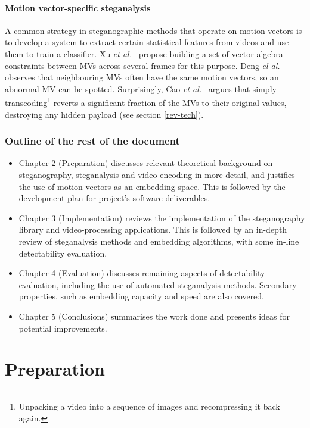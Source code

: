 \documentclass[12pt,british,twoside,notitlepage,usenames,dvipsnames,hypens,final]{report}
\numberwithin{equation}{section}
\numberwithin{figure}{section}
\begin{document}
\subsubsection*{Motion vector-specific steganalysis}

A common strategy in steganographic methods that operate on motion vectors is to develop a system to extract certain statistical features from videos and use them to train a classifier. Xu \emph{et al.}~\cite{xu2013video} propose building a set of vector algebra constraints between MVs across several frames for this purpose. Deng \emph{el al.}~\cite{deng2012digital} observes that neighbouring MVs often have the same motion vectors, so an abnormal MV can be spotted. Surprisingly, Cao \emph{et al.}~\cite{cao2012video} argues that simply transcoding\footnote{Unpacking a video into a sequence of images and recompressing it back again.} reverts a significant fraction of the MVs to their original values, destroying any hidden payload (see section \ref{rev-tech}).

\subsection*{Outline of the rest of the document}
\begin{itemize}
\item Chapter 2 (Preparation) discusses relevant theoretical background on steganography, steganalysis and video encoding in more detail, and justifies the use of motion vectors as an embedding space. This is followed by the development plan for project's software deliverables. 
\item Chapter 3 (Implementation) reviews the implementation of the steganography library and video-processing applications. This is followed by an in-depth review of steganalysis methods and embedding algorithms, with some in-line detectability evaluation.
\item Chapter 4 (Evaluation) discusses remaining aspects of detectability evaluation, including the use of automated steganalysis methods. Secondary properties, such as embedding capacity and speed are also covered.
\item Chapter 5 (Conclusions) summarises the work done and presents ideas for potential improvements.
\end{itemize}

\cleardoublepage
\chapter{Preparation}
\end{document}
